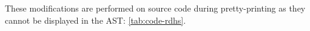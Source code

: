 \documentclass[%
class=scrreprt,
chapterprefix=false,%
open=right,%
twoside=false,%
paper=a4,%
logofile={Logo\_zentral\_farbig\_EN.png},%
thesistype=master,%
UKenglish,%
]{se2thesis}
\theoremstyle{definition}
\begin{document}
	These modifications are performed on source code during pretty-printing as they cannot be displayed in the AST: \autoref{tab:code-rdhs}.
		
	
\end{document}
